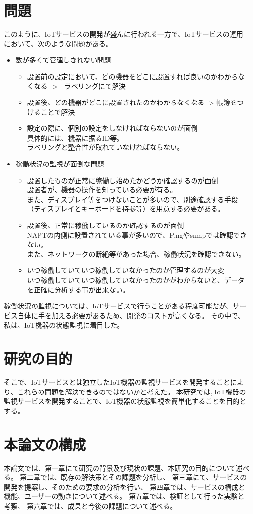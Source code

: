 \section{問題}
このように、IoTサービスの開発が盛んに行われる一方で、IoTサービスの運用において、次のような問題がある。
\begin{itemize}
	\item 数が多くて管理しきれない問題
	\begin{itemize}
		\item 設置前の設定において、どの機器をどこに設置すれば良いのかわからなくなる ->　ラベリングにて解決
		\item 設置後、どの機器がどこに設置されたのかわからなくなる -> 帳簿をつけることで解決
		\item 設定の際に、個別の設定をしなければならないのが面倒\\
			具体的には、機器に振るID等。\\
			ラベリングと整合性が取れていなければならない。
	\end{itemize}
	\item 稼働状況の監視が面倒な問題
	\begin{itemize}
		\item 設置したものが正常に稼働し始めたかどうか確認するのが面倒\\
			設置者が、機器の操作を知っている必要が有る。\\
			また、ディスプレイ等をつけないことが多いので、別途確認する手段（ディスプレイとキーボードを持参等）を用意する必要がある。
		\item 設置後、正常に稼働しているのか確認するのが面倒\\
			NAPTの内側に設置されている事が多いので、Pingやsnmpでは確認できない。\\
			また、ネットワークの断絶等があった場合、稼働状況を確認できない。
		\item いつ稼働していていつ稼働していなかったのか管理するのが大変\\
			いつ稼働していていつ稼働していなかったのかがわからないと、データを正確に分析する事が出来ない。
	\end{itemize}
\end{itemize}
稼働状況の監視については、IoTサービスで行うことがある程度可能だが、サービス自体に手を加える必要があるため、開発のコストが高くなる。
その中で、私は、IoT機器の状態監視に着目した。

\section{研究の目的}
そこで、IoTサービスとは独立したIoT機器の監視サービスを開発することにより、これらの問題を解決できるのではないかと考えた。
本研究では, IoT機器の監視サービスを開発することで、IoT機器の状態監視を簡単化することを目的とする。


\section{本論文の構成}
本論文では、第一章にて研究の背景及び現状の課題、本研究の目的について述べる。
第二章では、既存の解決策とその課題を分析し、
第三章にて、サービスの開発を提案し、そのための要求の分析を行い、
第四章では、サービスの構成と機能、ユーザーの動きについて述べる。
第五章では、検証として行った実験と考察、
第六章では、成果と今後の課題について述べる。
